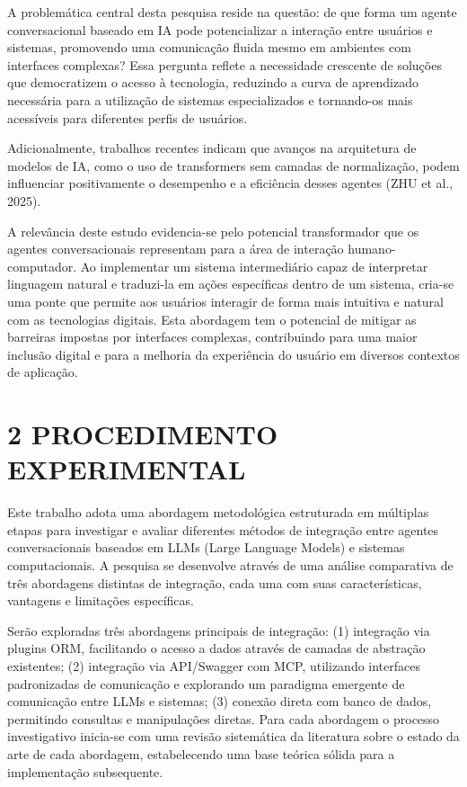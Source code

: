 \documentclass[
]{article}
\begin{document}
A problemática central desta pesquisa reside na questão: de que forma um
agente conversacional baseado em IA pode potencializar a interação entre
usuários e sistemas, promovendo uma comunicação fluida mesmo em
ambientes com interfaces complexas? Essa pergunta reflete a necessidade
crescente de soluções que democratizem o acesso à tecnologia, reduzindo
a curva de aprendizado necessária para a utilização de sistemas
especializados e tornando-os mais acessíveis para diferentes perfis de
usuários.

Adicionalmente, trabalhos recentes indicam que avanços na arquitetura de
modelos de IA, como o uso de transformers sem camadas de normalização,
podem influenciar positivamente o desempenho e a eficiência desses
agentes (ZHU et al., 2025).

A relevância deste estudo evidencia-se pelo potencial transformador que
os agentes conversacionais representam para a área de interação
humano-computador. Ao implementar um sistema intermediário capaz de
interpretar linguagem natural e traduzi-la em ações específicas dentro
de um sistema, cria-se uma ponte que permite aos usuários interagir de
forma mais intuitiva e natural com as tecnologias digitais. Esta
abordagem tem o potencial de mitigar as barreiras impostas por
interfaces complexas, contribuindo para uma maior inclusão digital e
para a melhoria da experiência do usuário em diversos contextos de
aplicação.

\section{2 PROCEDIMENTO EXPERIMENTAL}\label{procedimento-experimental}

Este trabalho adota uma abordagem metodológica estruturada em múltiplas
etapas para investigar e avaliar diferentes métodos de integração entre
agentes conversacionais baseados em LLMs (Large Language Models) e
sistemas computacionais. A pesquisa se desenvolve através de uma análise
comparativa de três abordagens distintas de integração, cada uma com
suas características, vantagens e limitações específicas.

Serão exploradas três abordagens principais de integração: (1)
integração via plugins ORM, facilitando o acesso a dados através de
camadas de abstração existentes; (2) integração via API/Swagger com MCP,
utilizando interfaces padronizadas de comunicação e explorando um
paradigma emergente de comunicação entre LLMs e sistemas; (3) conexão
direta com banco de dados, permitindo consultas e manipulações diretas.
Para cada abordagem o processo investigativo inicia-se com uma revisão
sistemática da literatura sobre o estado da arte de cada abordagem,
estabelecendo uma base teórica sólida para a implementação subsequente.
\end{document}
